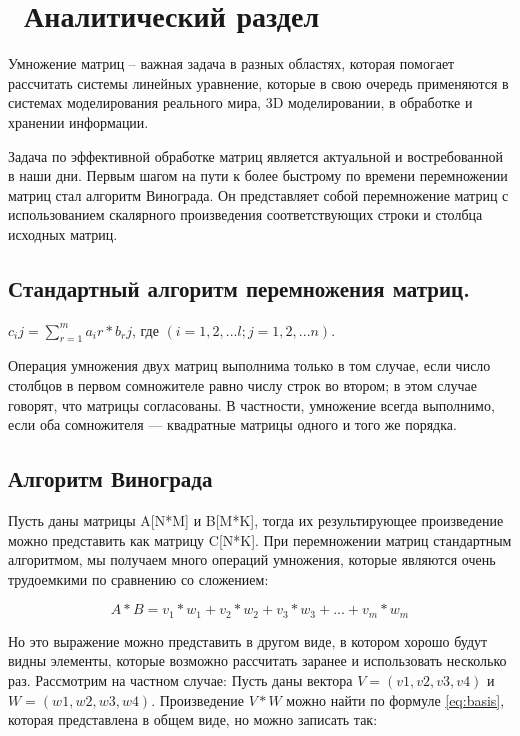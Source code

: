 \chapter{ Аналитический раздел}
\label{cha:analysis}

Умножение матриц -- важная задача в разных областях, которая помогает рассчитать системы линейных уравнение, которые в свою очередь применяются в системах моделирования реального мира, 3D моделировании, в обработке и хранении информации. 

Задача по эффективной обработке матриц является актуальной и востребованной в наши дни. Первым шагом на пути к более быстрому по времени перемножении матриц стал алгоритм Винограда. Он представляет собой перемножение матриц с использованием скалярного произведения соответствующих строки и столбца исходных матриц.

\section{ Стандартный алгоритм перемножения матриц.}
$c_ij = \sum_{r=1}^m a_ir * b_rj$, где $(i = 1, 2, ... l; j = 1, 2, ... n)$.


Операция умножения двух матриц выполнима только в том случае, если число столбцов в первом сомножителе равно числу строк во втором; в этом случае говорят, что матрицы согласованы. В частности, умножение всегда выполнимо, если оба сомножителя — квадратные матрицы одного и того же порядка.

\section{ Алгоритм Винограда}

Пусть даны матрицы A[N*M] и B[M*K], тогда их результирующее произведение можно представить как матрицу C[N*K]. При перемножении матриц стандартным алгоритмом, мы получаем много операций умножения, которые являются очень трудоемкими по сравнению со сложением:

\begin{equation}
    A * B = v_1*w_1 + v_2 * w_2 + v_3 * w_3 + ... + v_m * w_m
    \label{eq:basis}
\end{equation}

Но это выражение можно представить в другом виде, в котором хорошо будут видны элементы, которые возможно рассчитать заранее и использовать несколько раз. Рассмотрим на частном случае:
Пусть даны вектора $V = (v1, v2, v3, v4)$ и $W = (w1, w2, w3, w4)$. Произведение $V*W$ можно найти по формуле \ref{eq:basis}, которая представлена в общем виде, но можно записать так:

